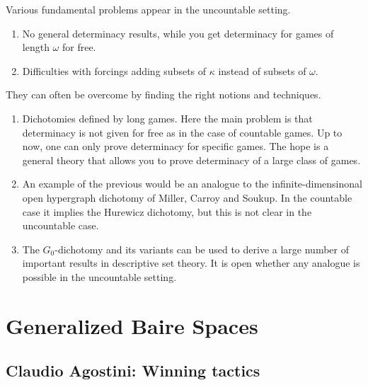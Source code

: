 \documentclass{amsart}
\theoremstyle{definition}
\begin{document}
Various fundamental problems appear in the uncountable setting. 

\begin{enumerate} 
\item 
No general determinacy results, while you get determinacy for games of length $\omega$ for free. 
\item 
Difficulties with forcings adding subsets of $\kappa$ instead of subsets of $\omega$. 
\end{enumerate} 

They can often be overcome by finding the right notions and techniques. 

\begin{enumerate} 
\item 
Dichotomies defined by long games. 
Here the main problem is that determinacy is not given for free as in the case of countable games. 
Up to now, one can only prove determinacy for specific games. 
The hope is a general theory that allows you to prove determinacy of a large class of games. 
\item 
An example of the previous would be an analogue to the infinite-dimensinonal open hypergraph dichotomy of Miller, Carroy and Soukup. 
In the countable case it implies the Hurewicz dichotomy, but this is not clear in the uncountable case. 
\item 
{} 
The $G_0$-dichotomy and its variants can be used to derive a large number of important results in descriptive set theory. 
It is open whether any analogue is possible in the uncountable setting. 

\end{enumerate} 

\fi 








\section{Generalized Baire Spaces} 

\subsection{Claudio Agostini: Winning tactics}
\end{document}
